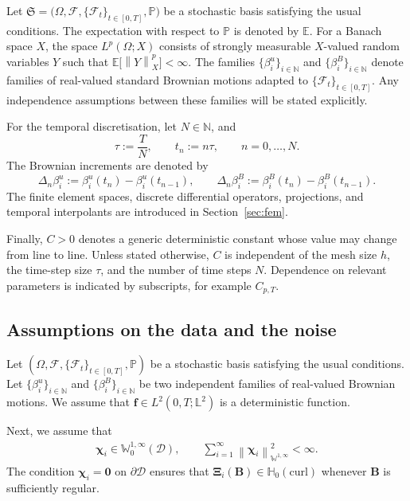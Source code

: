 \documentclass[11pt, reqno]{amsart}
\theoremstyle{definition}
\numberwithin{equation}{section}
\newcommand{\bff}{\boldsymbol}
\newcommand{\bb}{\mathbb}
\newcommand{\norm}[2]{\left\|{#1}\right\|_{#2}}
\newcommand{\hzerocurl}{\mathbb{H}_0(\mathrm{curl})}
\begin{document}
Let $\mathfrak{S}
=
\bigl(
\Omega,\mathscr{F},
\{\mathscr{F}_t\}_{t\in[0,T]},
\bb{P}
\bigr)$ be a stochastic basis satisfying the usual conditions. The expectation with respect to $\bb{P}$ is denoted by $\bb{E}$. For a Banach space $X$, the space $L^p(\Omega;X)$ consists of strongly measurable $X$-valued random variables $Y$ such that $\bb{E}\bigl[\norm{Y}{X}^p\bigr]<\infty$. The families $\{\beta_i^u\}_{i\in \bb{N}}$ and $\{\beta_i^B\}_{i\in \bb{N}}$ denote families of real-valued standard Brownian motions adapted to
$\{\mathscr{F}_t\}_{t\in[0,T]}$. Any independence assumptions between these
families will be stated explicitly.

For the temporal discretisation, let $N\in\mathbb{N}$, and
\begin{equation}\label{equ:tau}
\tau:=\frac{T}{N},
\qquad
t_n:=n\tau,
\qquad n=0,\ldots,N.
\end{equation}
The Brownian increments are denoted by
\begin{equation}\label{equ:Brownian increment}
\Delta_n\beta_i^u
:=
\beta_i^u(t_n)-\beta_i^u(t_{n-1}),
\qquad
\Delta_n\beta_i^B
:=
\beta_i^B(t_n)-\beta_i^B(t_{n-1}).
\end{equation}
The finite element spaces, discrete differential operators, projections, and
temporal interpolants are introduced in Section~\ref{sec:fem}.

Finally, $C>0$ denotes a generic deterministic constant whose value may
change from line to line. Unless stated otherwise, $C$ is independent of the
mesh size $h$, the time-step size $\tau$, and the number of time steps $N$.
Dependence on relevant parameters is indicated by subscripts, for example
$C_{p,T}$.




\subsection{Assumptions on the data and the noise}
\label{subsec:assumptions-noise}

Let $(\Omega,\mathscr{F},\{\mathscr{F}_t\}_{t\in[0,T]},\bb{P})$ be a stochastic basis satisfying the usual conditions. Let $\{\beta_i^u\}_{i\in\bb{N}}$ and $\{\beta_i^B\}_{i\in\bb{N}}$ be two independent families of real-valued Brownian motions. We assume that $\bff{f}\in L^2(0,T;\bb{L}^2)$ is a deterministic function.

Next, we assume that
\begin{align}\label{equ:chi assumption}
	\bff{\chi}_i\in \bb{W}^{1,\infty}_0(\mathscr{D}),\qquad
	\sum_{i=1}^\infty \norm{\bff{\chi}_i}{\bb{W}^{1,\infty}}^2<\infty.
\end{align}
The condition $\bff{\chi}_i=\bff{0}$ on $\partial\mathscr{D}$ ensures that $\bff{\Xi}_i(\bff{B})\in\hzerocurl$ whenever $\bff{B}$ is sufficiently regular.
\end{document}
